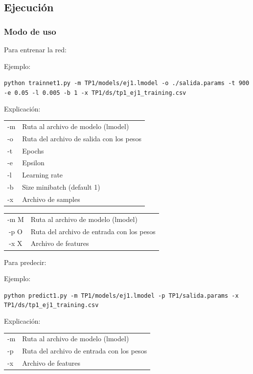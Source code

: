
\subsection{Ejecución}


\subsubsection{Modo de uso}

Para entrenar la red:

Ejemplo: 

\noindent\texttt{python trainnet1.py -m TP1/models/ej1.lmodel -o ./salida.params -t 900 -e 0.05 -l 0.005 -b 1 -x TP1/ds/tp1\_ej1\_training.csv}

Explicación:

\begin{tabular}{ l l }
-m & Ruta al archivo de modelo (lmodel) \\
-o & Ruta del archivo de salida con los pesos\\
-t & Epochs\\
-e & Epsilon\\
-l & Learning rate\\
-b & Size minibatch (default 1)\\
-x & Archivo de samples\\
\end{tabular}

\begin{tabular}{ c l }
-m M & Ruta al archivo de modelo (lmodel)\\
-p  O & Ruta del archivo de entrada con los pesos\\
-x  X & Archivo de features\\
\end{tabular}

Para predecir:

Ejemplo:

\noindent\texttt{\small{python predict1.py -m TP1/models/ej1.lmodel -p TP1/salida.params -x TP1/ds/tp1\_ej1\_training.csv}}

Explicación:

\begin{tabular}{ l l }
-m & Ruta al archivo de modelo (lmodel)\\
-p & Ruta del archivo de entrada con los pesos\\
-x & Archivo de features\\
\end{tabular}

